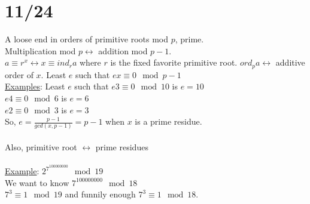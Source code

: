\documentclass[13pt]{article}
\begin{document}
	\section*{11/24}
		A loose end in orders of primitive roots mod $p$, prime.\\
		Multiplication mod $p \leftrightarrow$ addition mod $p-1$.\\
		$a \equiv r^x \leftrightarrow x \equiv ind_ra$ where $r$ is the fixed
		favorite primitive root. $ord_pa \leftrightarrow$ additive order of $x$.
		Least $e$ such that $ex \equiv 0 \mod p-1$\\
		\underline{Examples}: Least $e$ such that $e3 \equiv 0 \mod 10$ is $e 
		= 10$\\
		$e4 \equiv 0 \mod 6$ is $e = 6$\\
		$e2 \equiv 0 \mod 3$ is $e = 3$\\
		So, $e = \frac{p-1}{gcd(x,p-1)} = p-1$ when $x$ is a prime residue.\\\\
		Also, primitive root $\leftrightarrow$ prime residues\\\\
		\underline{Example}: $2^{7^{100000000}} \mod 19$\\
		We want to know $7^{100000000} \mod 18$\\
		$7^3 \equiv 1 \mod 19$ and funnily enough $7^3 \equiv 1 \mod 18$.\\
\end{document}
